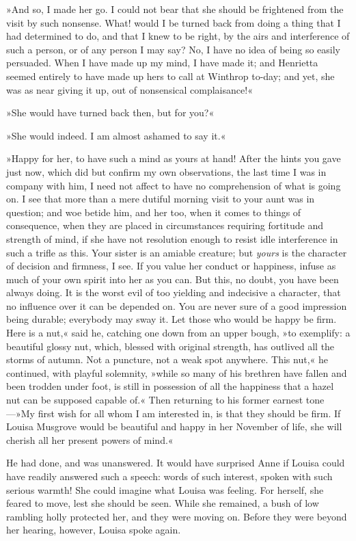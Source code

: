 »And so, I made her go. I could not bear that she should be frightened from the visit by such nonsense. What! would I be turned back from doing a thing that I had determined to do, and that I knew to be right, by the airs and interference of such a person, or of any person I may say? No, I have no idea of being so easily persuaded. When I have made up my mind, I have made it; and Henrietta seemed entirely to have made up hers to call at Winthrop to-day; and yet, she was as near giving it up, out of nonsensical complaisance!«

»She would have turned back then, but for you?«

»She would indeed. I am almost ashamed to say it.«

»Happy for her, to have such a mind as yours at hand! After the hints you gave just now, which did but confirm my own observations, the last time I was in company with him, I need not affect to have no comprehension of what is going on. I see that more than a mere dutiful morning visit to your aunt was in question; and woe betide him, and her too, when it comes to things of consequence, when they are placed in circumstances requiring fortitude and strength of mind, if she have not resolution enough to resist idle interference in such a trifle as this. Your sister is an amiable creature; but \textit{yours} is the character of decision and firmness, I see. If you value her conduct or happiness, infuse as much of your own spirit into her as you can. But this, no doubt, you have been always doing. It is the worst evil of too yielding and indecisive a character, that no influence over it can be depended on. You are never sure of a good impression being durable; everybody may sway it. Let those who would be happy be firm. Here is a nut,« said he, catching one down from an upper bough, »to exemplify: a beautiful glossy nut, which, blessed with original strength, has outlived all the storms of autumn. Not a puncture, not a weak spot anywhere. This nut,« he continued, with playful solemnity, »while so many of his brethren have fallen and been trodden under foot, is still in possession of all the happiness that a hazel nut can be supposed capable of.« Then returning to his former earnest tone—»My first wish for all whom I am interested in, is that they should be firm. If Louisa Musgrove would be beautiful and happy in her November of life, she will cherish all her present powers of mind.«

He had done, and was unanswered. It would have surprised Anne if Louisa could have readily answered such a speech: words of such interest, spoken with such serious warmth! She could imagine what Louisa was feeling. For herself, she feared to move, lest she should be seen. While she remained, a bush of low rambling holly protected her, and they were moving on. Before they were beyond her hearing, however, Louisa spoke again.

